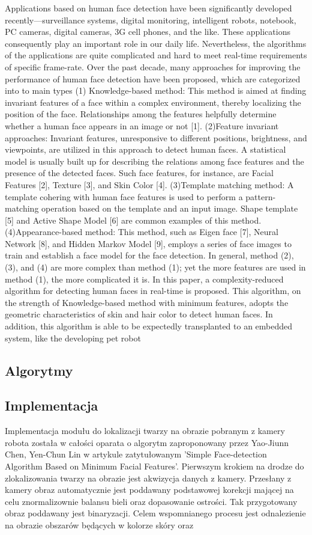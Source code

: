 Applications based on human face detection have been
significantly developed recently—surveillance systems,
digital monitoring, intelligent robots, notebook, PC cameras,
digital cameras, 3G cell phones, and the like. These
applications consequently play an important role in our daily
life. Nevertheless, the algorithms of the applications are quite
complicated and hard to meet real-time requirements of
specific frame-rate.
Over the past decade, many approaches for improving the
performance of human face detection have been proposed,
which are categorized into to main types (1) Knowledge-based
method: This method is aimed at finding invariant features of
a face within a complex environment, thereby localizing the
position of the face. Relationships among the features
helpfully determine whether a human face appears in an image
or not [1]. (2)Feature invariant approaches: Invariant features,
unresponsive to different positions, brightness, and viewpoints,
are utilized in this approach to detect human faces. A
statistical model is usually built up for describing the relations
among face features and the presence of the detected faces.
Such face features, for instance, are Facial Features [2],
Texture [3], and Skin Color [4]. (3)Template matching
method: A template cohering with human face features is used
to perform a pattern-matching operation based on the template
and an input image. Shape template [5] and Active Shape
Model [6] are common examples of this method.
(4)Appearance-based method: This method, such as Eigen
face [7], Neural Network [8], and Hidden Markov Model [9],
employs a series of face images to train and establish a face
model for the face detection. In general, method (2), (3), and
(4) are more complex than method (1); yet the more features
are used in method (1), the more complicated it is.
In this paper, a complexity-reduced algorithm for detecting
human faces in real-time is proposed. This algorithm, on the
strength of Knowledge-based method with minimum features,
adopts the geometric characteristics of skin and hair color to
detect human faces. In addition, this algorithm is able to be
expectedly transplanted to an embedded system, like the
developing pet robot
\subsection{Algorytmy}
\subsection{Implementacja}
Implementacja modułu do lokalizacji twarzy na obrazie pobranym z kamery
robota została w całości oparata o algorytm zaproponowany przez Yao-Jiunn Chen,
Yen-Chun Lin w artykule zatytułowanym 'Simple Face-detection Algorithm Based on
Minimum Facial Features'. 
Pierwszym krokiem na drodze do zlokalizowania twarzy na obrazie jest akwizycja
danych z kamery. Przesłany z kamery obraz automatycznie jest poddawany
podstawowej korekcji mającej na celu znormalizownie balansu bieli oraz
dopasowanie ostrości. Tak przygotowany obraz poddawany jest binaryzacji. Celem
wspomnianego procesu jest odnalezienie na obrazie obszarów będących w kolorze
skóry oraz 
